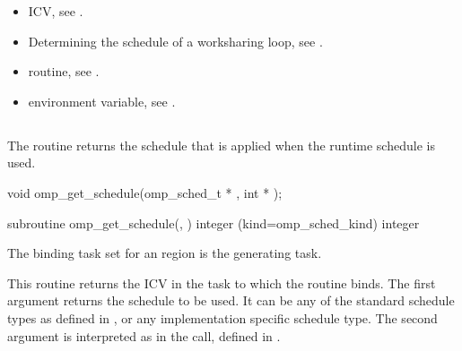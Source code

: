 \crossreferences
\begin{itemize}
\item {} ICV, see 
.

\item Determining the schedule of a worksharing loop, see 
.

\item {} routine, see 
.

\item {} environment variable, see 
.
\end{itemize}









\subsection{}
\label{subsec:omp_get_schedule}
\summary
The  routine returns the schedule that is applied when the 
runtime schedule is used. 
\format
\ccppspecificstart
\begin{boxedcode}
void omp\_get\_schedule(omp\_sched\_t * , int * ); 
\end{boxedcode}
\ccppspecificend

\fortranspecificstart
\begin{boxedcode}
subroutine omp\_get\_schedule(, ) 
integer (kind=omp\_sched\_kind)  
integer 
\end{boxedcode}
\fortranspecificend

\binding
The binding task set for an  region is the generating task. 

\effect
This routine returns the  ICV in the task to which the routine binds. The 
first argument  returns the schedule to be used. It can be any of the standard 
schedule types as defined in 
, 
or any implementation specific 
schedule type. The second argument is interpreted as in the  call, 
defined in 
.

